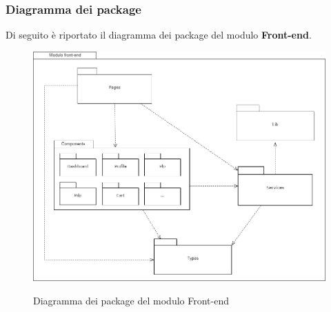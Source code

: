 \subsubsection{Diagramma dei package}

Di seguito è riportato il diagramma dei package del modulo \textbf{Front-end}.

\vspace{1cm}

\begin{figure}[H]
\centering
\includegraphics[scale=0.43]{res/Architettura/Frontend/img/package_frontend.png}\\
\caption{Diagramma dei package del modulo Front-end}
\end{figure}